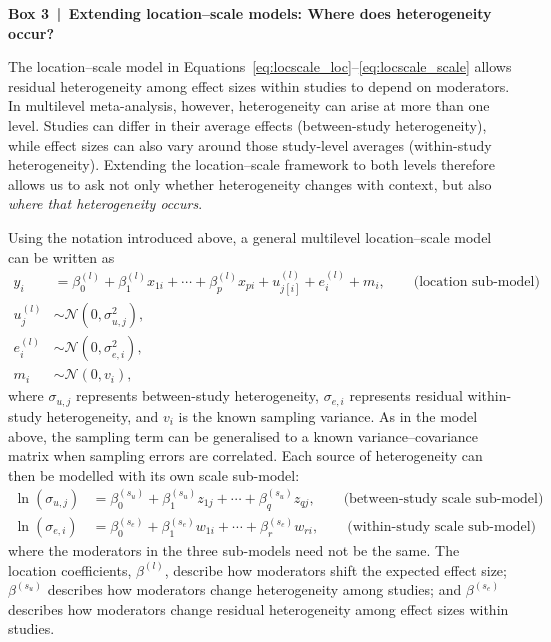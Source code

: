 \clearpage
\begin{tcolorbox}[
  breakable,
  enhanced,
  colback=white,
  colframe=black,
  boxrule=0.7pt,
  arc=0pt,
  left=10pt,
  right=10pt,
  top=8pt,
  bottom=8pt,
  before skip=12pt,
  after skip=12pt
]

\textbf{Box 3 \,|\, Extending location--scale models:\newline
Where does heterogeneity occur?}

The location--scale model in
Equations~\eqref{eq:locscale_loc}--\eqref{eq:locscale_scale} allows residual
heterogeneity among effect sizes within studies to depend on moderators. In
multilevel meta-analysis, however, heterogeneity can arise at more than one
level. Studies can differ in their average effects (between-study
heterogeneity), while effect sizes can also vary around those study-level
averages (within-study heterogeneity). Extending the location--scale framework
to both levels therefore allows us to ask not only whether heterogeneity changes
with context, but also \emph{where that heterogeneity occurs}.

Using the notation introduced above, a general multilevel location--scale model
can be written as
\begin{align}
  y_i
  &=
  \beta_0^{(l)}
  + \beta_1^{(l)}x_{1i}
  + \cdots
  + \beta_p^{(l)}x_{pi}
  + u_{j[i]}^{(l)}
  + e_i^{(l)}
  + m_i,
  \qquad \text{(location sub-model)}
  \label{eq:box3_location}\\
  u_j^{(l)}
  &\sim
  \mathcal{N}(0,\sigma_{u,j}^{2}),
  \label{eq:box3_study}\\
  e_i^{(l)}
  &\sim
  \mathcal{N}(0,\sigma_{e,i}^{2}),
  \label{eq:box3_residual}\\
  m_i
  &\sim
  \mathcal{N}(0,v_i),
  \label{eq:box3_sampling}
\end{align}
where $\sigma_{u,j}$ represents between-study heterogeneity,
$\sigma_{e,i}$ represents residual within-study heterogeneity, and $v_i$ is the
known sampling variance. As in the model above, the sampling term can be
generalised to a known variance--covariance matrix when sampling errors are
correlated. Each source of heterogeneity can then be modelled with its own scale
sub-model:
\begin{align}
  \ln(\sigma_{u,j})
  &=
  \beta_0^{(s_u)}
  + \beta_1^{(s_u)}z_{1j}
  + \cdots
  + \beta_q^{(s_u)}z_{qj},
  \qquad \text{(between-study scale sub-model)}
  \label{eq:box3_scale1}\\
  \ln(\sigma_{e,i})
  &=
  \beta_0^{(s_e)}
  + \beta_1^{(s_e)}w_{1i}
  + \cdots
  + \beta_r^{(s_e)}w_{ri},
  \qquad \text{(within-study scale sub-model)}
  \label{eq:box3_scale2}
\end{align}
where the moderators in the three sub-models need not be the same. The location
coefficients, $\beta^{(l)}$, describe how moderators shift the expected effect
size; $\beta^{(s_u)}$ describes how moderators change heterogeneity among
studies; and $\beta^{(s_e)}$ describes how moderators change residual
heterogeneity among effect sizes within studies.


\end{tcolorbox}

